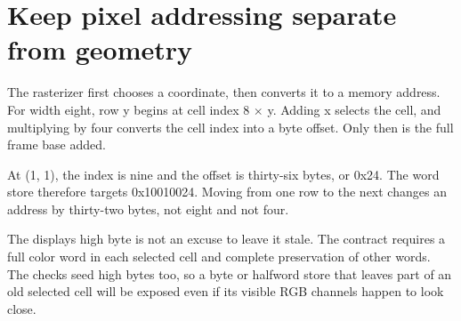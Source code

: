 \section{Keep pixel addressing separate from
  geometry}\label{007-bresenham-line-p05-keep-pixel-addressing-separate-from-geometry}

The rasterizer first chooses a coordinate, then converts it to a memory
address. For width eight, row y begins at cell index 8 \ensuremath{\times} y. Adding x
selects the cell, and multiplying by four converts the cell index into a
byte offset. Only then is the full frame base added.

At (1, 1), the index is nine and the offset is thirty-six bytes, or
0x24. The word store therefore targets 0x10010024. Moving from one row
to the next changes an address by thirty-two bytes, not eight and not
four.

The display\textquotesingle s high byte is not an excuse to leave it
stale. The contract requires a full color word in each selected cell and
complete preservation of other words. The checks seed high bytes too, so
a byte or halfword store that leaves part of an old selected cell will
be exposed even if its visible RGB channels happen to look close.
